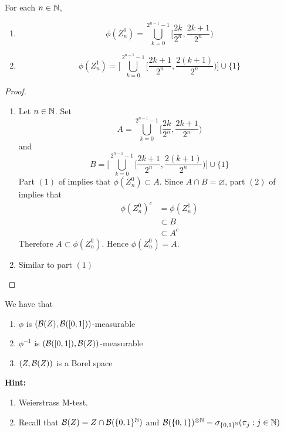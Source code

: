 \documentclass{book}
\begin{document}
	\begin{ex} 
		For each $n \in \mathbb{N}$, 
		\begin{enumerate}
			\item $$\phi(Z_n^0) = \bigcup_{k =0}^{2^{n-1} -1} \bigg[ \frac{2k}{2^n}, \frac{2k+1}{2^n} \bigg)$$
			\item $$\phi(Z_n^1) = \bigg[ \bigcup\limits_{k =0}^{2^{n-1} -1} \bigg[ \frac{2k + 1}{2^n}, \frac{2(k+1)}{2^n} \bigg) \bigg] \cup \{1\}$$
		\end{enumerate}
	\end{ex}
	
	\begin{proof}\
		\begin{enumerate}
			\item Let $n \in \mathbb{N}$. Set 
			$$A =  \bigcup\limits_{k =0}^{2^{n-1} - 1} \bigg[ \frac{2k}{2^n}, \frac{2k+1}{2^n} \bigg)$$ 
			and 
			$$B = \bigg[ \bigcup\limits_{k =0}^{2^{n-1} -1} \bigg[ \frac{2k + 1}{2^n}, \frac{2(k+1)}{2^n} \bigg) \bigg] \cup \{1\}$$ 
			Part $(1)$ of  implies that $\phi(Z_n^0) \subset A$. Since $A \cap B = \varnothing$, part $(2)$ of \rex{28005.1} implies that 
			\begin{align*}
				\phi(Z_n^0)^c 
				& = \phi(Z_n^1) \\
				& \subset B \\
				& \subset A^c
			\end{align*} 
			Therefore $A \subset \phi(Z_n^0)$. Hence $\phi(Z_n^0) = A$.
			\item Similar to part $(1)$
		\end{enumerate}
	\end{proof}
	
	\begin{ex}  
		We have that
		\begin{enumerate}
			\item $\phi$ is $(\mathcal{B}(Z), \mathcal{B}([0,1]))$-measurable
			\item $\phi^{-1}$ is $(\mathcal{B}([0,1]), \mathcal{B}(Z))$-measurable
			\item $(Z, \mathcal{B}(Z))$ is a Borel space
		\end{enumerate}
		\textbf{Hint: } \begin{enumerate}
			\item Weierstrass M-test.
			\item Recall that $\mathcal{B}(Z) = Z \cap \mathcal{B}(\{0,1\}^{\mathbb{N}})$ and $\mathcal{B}(\{0,1\})^{\otimes \mathbb{N}} = \sigma_{\{0,1\}^{\mathbb{N}}} (\pi_j: j \in \mathbb{N})$
		\end{enumerate} 
	\end{ex}
	
\end{document}

